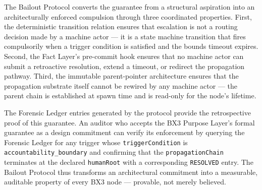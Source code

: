 The Bailout Protocol converts the guarantee from a structural aspiration into an architecturally enforced compulsion through three coordinated properties. First, the deterministic transition relation ensures that escalation is not a routing decision made by a machine actor — it is a state machine transition that fires compulsorily when a trigger condition is satisfied and the bounds timeout expires. Second, the Fact Layer's pre-commit hook ensures that no machine actor can submit a retroactive resolution, extend a timeout, or redirect the propagation pathway. Third, the immutable parent-pointer architecture ensures that the propagation substrate itself cannot be rewired by any machine actor — the parent chain is established at spawn time and is read-only for the node's lifetime.

The Forensic Ledger entries generated by the protocol provide the retrospective proof of this guarantee. An auditor who accepts the BX3 Purpose Layer's formal guarantee as a design commitment can verify its enforcement by querying the Forensic Ledger for any trigger whose \texttt{triggerCondition} is \texttt{accountability\_boundary} and confirming that the \texttt{propagationChain} terminates at the declared \texttt{humanRoot} with a corresponding \texttt{RESOLVED} entry. The Bailout Protocol thus transforms an architectural commitment into a measurable, auditable property of every BX3 node — provable, not merely believed.